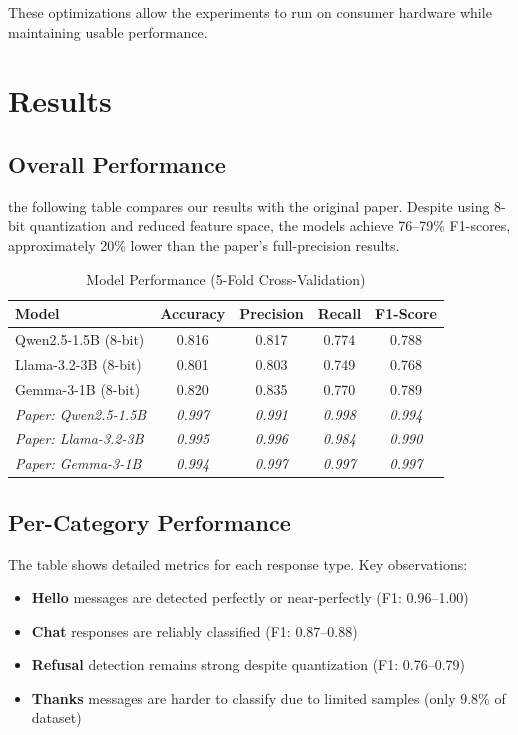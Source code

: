 \documentclass[11pt]{article}
\begin{document}
These optimizations allow the experiments to run on consumer hardware while maintaining usable performance.

\section{Results}

\subsection{Overall Performance}

the following table compares our results with the original paper. Despite using 8-bit quantization and reduced feature space, the models achieve 76--79\% F1-scores, approximately 20\% lower than the paper's full-precision results.

\begin{table}[H]
\centering
\caption{Model Performance (5-Fold Cross-Validation)}
\label{tab:overall}
\begin{tabular}{@{}lcccc@{}}
\toprule
\textbf{Model} & \textbf{Accuracy} & \textbf{Precision} & \textbf{Recall} & \textbf{F1-Score} \\
\midrule
Qwen2.5-1.5B (8-bit) & 0.816 & 0.817 & 0.774 & 0.788 \\
Llama-3.2-3B (8-bit) & 0.801 & 0.803 & 0.749 & 0.768 \\
Gemma-3-1B (8-bit) & 0.820 & 0.835 & 0.770 & 0.789 \\
\midrule
\textit{Paper: Qwen2.5-1.5B} & \textit{0.997} & \textit{0.991} & \textit{0.998} & \textit{0.994} \\
\textit{Paper: Llama-3.2-3B} & \textit{0.995} & \textit{0.996} & \textit{0.984} & \textit{0.990} \\
\textit{Paper: Gemma-3-1B} & \textit{0.994} & \textit{0.997} & \textit{0.997} & \textit{0.997} \\
\bottomrule
\end{tabular}
\end{table}

\subsection{Per-Category Performance}

The table  shows detailed metrics for each response type. Key observations:
\begin{itemize}
    \item \textbf{Hello} messages are detected perfectly or near-perfectly (F1: 0.96--1.00)
    \item \textbf{Chat} responses are reliably classified (F1: 0.87--0.88)
    \item \textbf{Refusal} detection remains strong despite quantization (F1: 0.76--0.79)
    \item \textbf{Thanks} messages are harder to classify due to limited samples (only 9.8\% of dataset)
\end{itemize}
\end{document}
